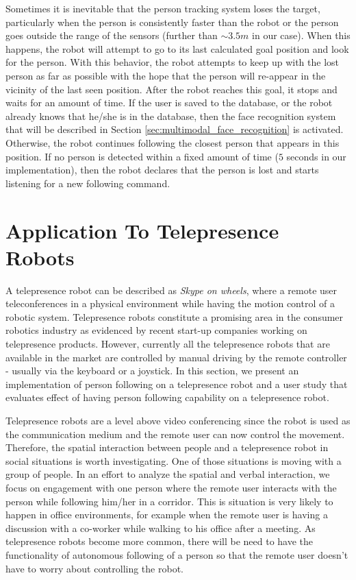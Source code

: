 Sometimes it is inevitable that the person tracking system loses the target, particularly when the person is consistently faster than the robot or the person goes outside the range of the sensors (further than $\sim3.5m$ in our case). When this happens, the robot will attempt to go to its last calculated goal position and look for the person. With this behavior, the robot attempts to keep up with the lost person as far as possible with the hope that the person will re-appear in the vicinity of the last seen position. After the robot reaches this goal, it stops and waits for an amount of time. If the user is saved to the database, or the robot already knows that he/she is in the database, then the face recognition system that will be described in Section \ref{sec:multimodal_face_recognition} is activated. Otherwise, the robot continues following the closest person that appears in this position. If no person is detected within a fixed amount of time ($5$ seconds in our implementation), then the robot declares that the person is lost and starts listening for a new following command.

\section{Application To Telepresence Robots}
\label{sec:following_application_to_telepresence}

A telepresence robot can be described as \textit{Skype on wheels}, where a remote user teleconferences in a physical environment while having the motion control of a robotic system. Telepresence robots constitute a promising area in the consumer robotics industry as evidenced by recent start-up companies working on telepresence products. However, currently all the telepresence robots that are available in the market are controlled by manual driving by the remote controller - usually via the keyboard or a joystick. In this section, we present an implementation of person following on a telepresence robot and a user study that evaluates effect of having person following capability on a telepresence robot.

Telepresence robots are a level above video conferencing since the robot is used as the communication medium and the remote user can now control the movement. Therefore, the spatial interaction between people and a telepresence robot in social situations is worth investigating. One of those situations is moving with a group of people. In an effort to analyze the spatial and verbal interaction, we focus on engagement with one person where the remote user interacts with the person while following him/her in a corridor. This is situation is very likely to happen in office environments, for example when the remote user is having a discussion with a co-worker while walking to his office after a meeting. As telepresence robots become more common, there will be need to have the functionality of autonomous following of a person so that the remote user doesn't have to worry about controlling the robot.

